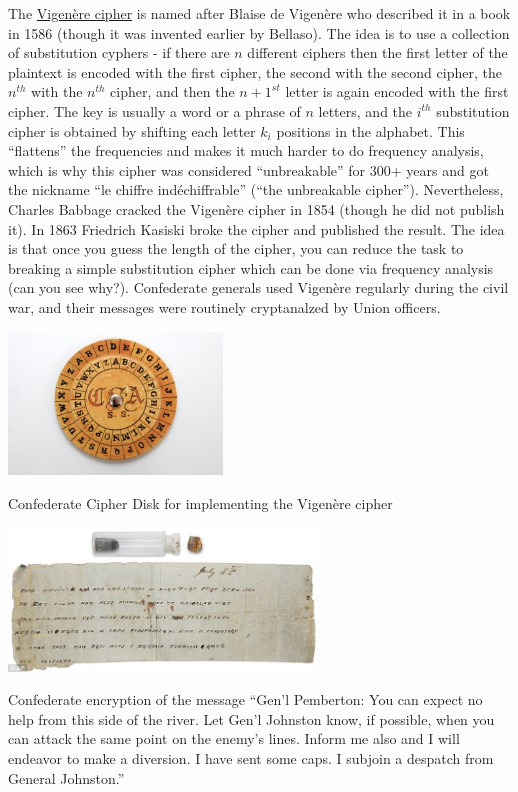The \href{https://en.wikipedia.org/wiki/Vigen\%C3\%A8re_cipher}{Vigenère
cipher} is named after Blaise de Vigenère who described it in a book in
1586 (though it was invented earlier by Bellaso). The idea is to use a
collection of substitution cyphers - if there are \(n\) different
ciphers then the first letter of the plaintext is encoded with the first
cipher, the second with the second cipher, the \(n^{th}\) with the
\(n^{th}\) cipher, and then the \(n+1^{st}\) letter is again encoded
with the first cipher. The key is usually a word or a phrase of \(n\)
letters, and the \(i^{th}\) substitution cipher is obtained by shifting
each letter \(k_i\) positions in the alphabet. This ``flattens'' the
frequencies and makes it much harder to do frequency analysis, which is
why this cipher was considered ``unbreakable'' for 300+ years and got
the nickname ``le chiffre indéchiffrable'' (``the unbreakable cipher'').
Nevertheless, Charles Babbage cracked the Vigenère cipher in 1854
(though he did not publish it). In 1863 Friedrich Kasiski broke the
cipher and published the result. The idea is that once you guess the
length of the cipher, you can reduce the task to breaking a simple
substitution cipher which can be done via frequency analysis (can you
see why?). Confederate generals used Vigenère regularly during the civil
war, and their messages were routinely cryptanalzed by Union officers.

\begin{marginfigure}
\centering
\includegraphics[width=\linewidth, height=1.5in, keepaspectratio]{../figure/confederate_cipher_disk.jpg}
\caption{Confederate Cipher Disk for implementing the Vigenère cipher}
\label{tmplabelfig}
\end{marginfigure}

\begin{marginfigure}
\centering
\includegraphics[width=\linewidth, height=1.5in, keepaspectratio]{../figure/confederate_message.jpg}
\caption{Confederate encryption of the message ``Gen'l Pemberton: You
can expect no help from this side of the river. Let Gen'l Johnston know,
if possible, when you can attack the same point on the enemy's lines.
Inform me also and I will endeavor to make a diversion. I have sent some
caps. I subjoin a despatch from General Johnston.''}
\label{tmplabelfig}
\end{marginfigure}

